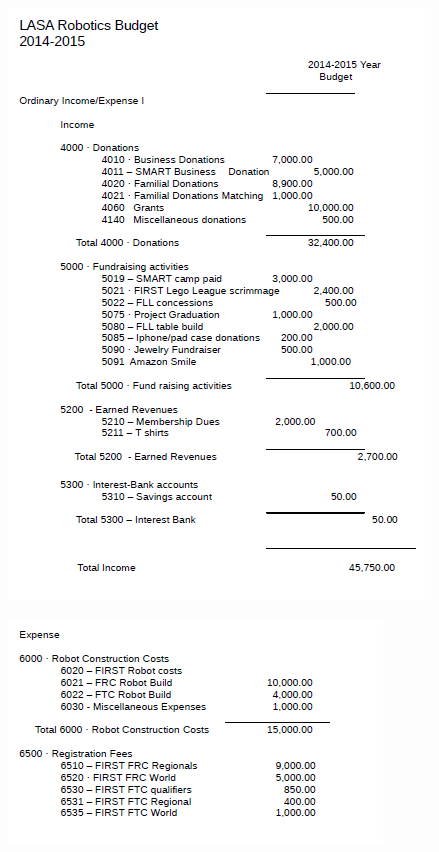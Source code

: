 \begin{figure}
	\color{darkgray}
	\centering
	\includegraphics[width=0.9\linewidth]{budget}
\end{figure}
\begin{figure}
	\color{darkgray}
	\centering
	\includegraphics[width=0.9\linewidth]{budget2}
\end{figure}
